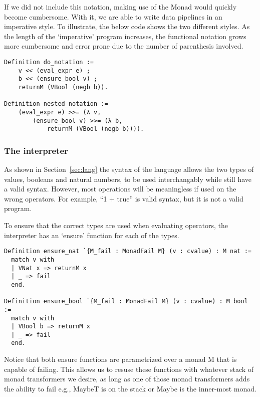 If we did not include this notation, making use of the Monad would quickly
become cumbersome. With it, we are able to write data pipelines in an
imperative style. To illustrate, the below code shows the two
different styles. As the length of the `imperative' program increases, the
functional notation grows more cumbersome and error prone due to the number of
parenthesis involved.

\begin{listing}
\begin{verbatim}
Definition do_notation :=
	v << (eval_expr e) ;
	b << (ensure_bool v) ;
	returnM (VBool (negb b)).

Definition nested_notation :=
	(eval_expr e) >>= (λ v,
		(ensure_bool v) >>= (λ b,
			returnM (VBool (negb b)))).
\end{verbatim}
\end{listing}

\subsubsection{The interpreter}
As shown in Section~\ref{sec:lang} the syntax of the language allows the two
types of values, booleans and natural numbers, to be used interchangably while
still have a valid syntax. However, most operations will be meaningless if used
on the wrong operators. For example, ``1 + true'' is valid syntax, but it is 
not a valid program.

To ensure that the correct types are used when evaluating operators,
the interpreter has an `ensure' function for each of the types. 

\begin{listing}
\begin{verbatim}
Definition ensure_nat `{M_fail : MonadFail M} (v : cvalue) : M nat :=
  match v with
  | VNat x => returnM x
  | _ => fail
  end.
            
Definition ensure_bool `{M_fail : MonadFail M} (v : cvalue) : M bool :=
  match v with
  | VBool b => returnM x
  | _ => fail
  end.
\end{verbatim}
\end{listing}

Notice that both ensure functions are parametrized over a monad M that is
capable of failing. This allows us to resuse these functions with whatever
stack of monad transformers we desire, as long as one of those monad
transformers adds the ability to fail e.g., MaybeT is on the stack or Maybe is
the inner-most monad.

